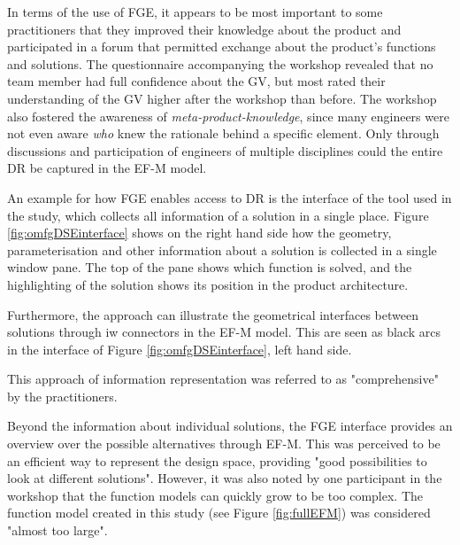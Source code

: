 \documentclass[aerospace,article,submit,moreauthors,pdftex]{Definitions/mdpi}
\begin{document}
In terms of the use of \ac{FGE}, it appears to be most important to some practitioners that they improved their knowledge about the product and participated in a forum that permitted exchange about the product's functions and solutions.
The questionnaire accompanying the workshop revealed that no team member had full confidence about the \ac{GV}, but most rated their understanding of the GV higher after the workshop than before.
The workshop also fostered the awareness of \textit{meta-product-knowledge}, since many engineers were not even aware \textit{who} knew the rationale behind a specific element.
Only through discussions and participation of engineers of multiple disciplines could the entire DR be captured in the EF-M model.


An example for how \ac{FGE} enables access to \ac{DR} is the interface of the tool used in the study, which collects all information of a solution in a single place.
Figure \ref{fig:omfgDSEinterface} shows on the right hand side how the geometry, parameterisation and other information about a solution is collected in a single window pane.
The top of the pane shows which function is solved, and the highlighting of the solution shows its position in the product architecture.

Furthermore, the approach can illustrate the geometrical interfaces between solutions through \ac{iw} connectors in the \ac{EF-M} model.
This are seen as black arcs in the interface of Figure \ref{fig:omfgDSEinterface}, left hand side.

This approach of information representation was referred to as "comprehensive" by the practitioners.

Beyond the information about individual solutions, the \ac{FGE} interface provides an overview over the possible alternatives through \ac{EF-M}.
This was perceived to be an efficient way to represent the design space, providing "good possibilities to look at different solutions".
However, it was also noted by one participant in the workshop that the function models can quickly grow to be too complex.
The function model created in this study (see Figure \ref{fig:fullEFM}) was considered "almost too large".




\end{document}
